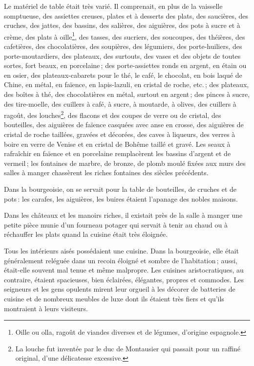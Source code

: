 Le matériel de table était très varié. Il comprenait, en plus de la vaisselle
somptueuse, des assiettes creuses, plates et à desserts des plats, des
saucières, des cruches, des jattes, des bassins, des salières, des aiguières,
des pots à sucre et à crème, des plats à oille\footnote{Oille ou olla, ragoût
de viandes diverses et de légumes, d'origine espagnole.}, des tasses, des
sucriers, des soucoupes, des théières, des cafetières, des chocolatières, des
soupières, des légumiers, des porte-huiliers, des porte-moutardiers, des
plateaux, des surtouts, des vases et des objets de toutes sortes, fort beaux,
en porcelaine ; des porte-assiettes ronds en argent, en étain ou en osier, des
plateaux-cabarets pour le thé, le café, le chocolat, en bois laqué de Chine, en
métal, en faïence, en lapis-lazuli, en cristal de roche, etc. ; des plateaux,
des boîtes à thé, des chocolatières en métal, surtout en argent ; des pinces
à sucre, des tire-moelle, des cuillers à café, à sucre, à moutarde, à olives,
des cuillers à ragoût, des louches\footnote{La louche fut inventée par le duc
de Montausier qui passait pour un raffiné original, d'une délicatesse
excessive.}, des flacons et des coupes de verre ou de cristal, des bouteilles,
des aiguières de faïence casquées avec anse en crosse, des aiguières de cristal
de roche taillées, gravées et décorées, des caves à liqueurs, des verres
à boire en verre de Venise et en cristal de Bohême taillé et gravé. Les seaux
à rafraîchir en faïence et en porcelaine remplacèrent les bassins d'argent et
de vermeil ; les fontaines de marbre, de bronze, de plomb moulé fixées aux murs
des salles à manger chassèrent les riches fontaines des siècles précédents.

Dans la bourgeoisie, on se servait pour la table de bouteilles, de cruches et
de pots : les carafes, les aiguières, les buires étaient l'apanage des nobles
maisons.

Dans les châteaux et les manoirs riches, il existait près de la salle à manger
une petite pièce munie d'un fourneau potager qui servait à tenir au chaud ou
à réchauffer les plats quand la cuisine était très éloignée.

Tous les intérieurs aisés possédaient une cuisine. Dans la bourgeoisie, elle
était généralement reléguée dans un recoin éloigné et sombre de l'habitation ;
aussi, était-elle souvent mal tenue et même malpropre. Les cuisines
aristocratiques, au contraire, étaient spacieuses, bien éclairées, élégantes,
propres et commodes. Les seigneurs et les gens opulents mirent leur orgueil
à les décorer de batteries de cuisine et de nombreux meubles de luxe dont ils
étaient très fiers et qu'ils montraient à leurs visiteurs.

